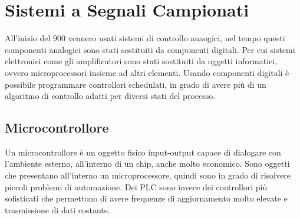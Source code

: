 \documentclass{article}
\numberwithin{equation}{subsection}
\begin{document}
\begin{center}\end{center}

\clearpage

\section{Sistemi a Segnali Campionati}

All'inizio del $900$ vennero usati sistemi di controllo anaogici, nel tempo questi componenti analogici sono stati sostituiti da componenti digitali. Per cui sistemi elettronici 
come gli amplificatori sono stati sostituiti da oggetti informatici, ovvero microprocessori insieme ad altri elementi. Usando componenti digitali è possibile programmare 
controllori schedulati, in grado di avere più di un algoritmo di controllo adatti per diversi stati del processo.    

\subsection{Microcontrollore}

Un microcontrollore è un oggetto fisico input-output capace di dialogare con l'ambiente esterno, all'interno di un chip, anche molto economico. Sono oggetti che presentano 
all'interno un microprocessore, quindi sono in grado di risolvere piccoli problemi di automazione. Dei PLC sono invece dei controllori più sofisticati che permettono di 
avere frequenze di aggiornamento molto elevate e trasmissione di dati costante. 
\end{document}
